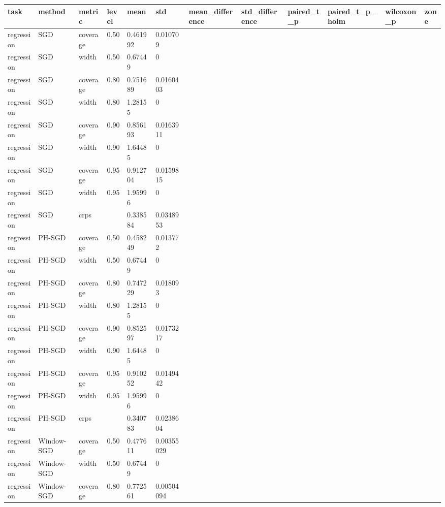\begin{tabular}{llllllllllll}
\hline
task & method & metric & level & mean & std & mean\_difference & std\_difference & paired\_t\_p & paired\_t\_p\_holm & wilcoxon\_p & zone \\
\hline
regression & SGD & coverage & 0.50 & 0.461992 & 0.010709 &  &  &  &  &  &  \\
regression & SGD & width & 0.50 & 0.67449 & 0 &  &  &  &  &  &  \\
regression & SGD & coverage & 0.80 & 0.751689 & 0.0160403 &  &  &  &  &  &  \\
regression & SGD & width & 0.80 & 1.28155 & 0 &  &  &  &  &  &  \\
regression & SGD & coverage & 0.90 & 0.856193 & 0.0163911 &  &  &  &  &  &  \\
regression & SGD & width & 0.90 & 1.64485 & 0 &  &  &  &  &  &  \\
regression & SGD & coverage & 0.95 & 0.912704 & 0.0159815 &  &  &  &  &  &  \\
regression & SGD & width & 0.95 & 1.95996 & 0 &  &  &  &  &  &  \\
regression & SGD & crps &  & 0.338584 & 0.0348953 &  &  &  &  &  &  \\
regression & PH-SGD & coverage & 0.50 & 0.458249 & 0.013772 &  &  &  &  &  &  \\
regression & PH-SGD & width & 0.50 & 0.67449 & 0 &  &  &  &  &  &  \\
regression & PH-SGD & coverage & 0.80 & 0.747229 & 0.018093 &  &  &  &  &  &  \\
regression & PH-SGD & width & 0.80 & 1.28155 & 0 &  &  &  &  &  &  \\
regression & PH-SGD & coverage & 0.90 & 0.852597 & 0.0173217 &  &  &  &  &  &  \\
regression & PH-SGD & width & 0.90 & 1.64485 & 0 &  &  &  &  &  &  \\
regression & PH-SGD & coverage & 0.95 & 0.910252 & 0.0149442 &  &  &  &  &  &  \\
regression & PH-SGD & width & 0.95 & 1.95996 & 0 &  &  &  &  &  &  \\
regression & PH-SGD & crps &  & 0.340783 & 0.0238604 &  &  &  &  &  &  \\
regression & Window-SGD & coverage & 0.50 & 0.477611 & 0.00355029 &  &  &  &  &  &  \\
regression & Window-SGD & width & 0.50 & 0.67449 & 0 &  &  &  &  &  &  \\
regression & Window-SGD & coverage & 0.80 & 0.772561 & 0.00504094 &  &  &  &  &  &  \\

\end{tabular}
